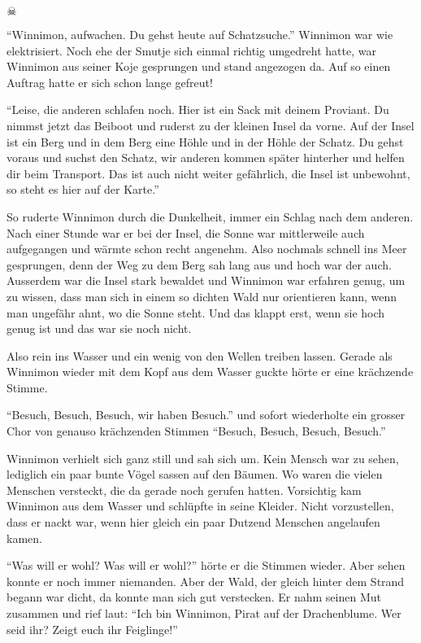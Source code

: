 \begin{center}
{\huge $\skull$}
\end{center}

\enquote{Winnimon, aufwachen. Du gehst heute auf Schatzsuche.} Winnimon war wie elektrisiert. Noch ehe der Smutje sich einmal richtig umgedreht hatte, war Winnimon aus seiner Koje gesprungen und stand angezogen da. Auf so einen Auftrag hatte er sich schon lange gefreut!

\enquote{Leise, die anderen schlafen noch. Hier ist ein Sack mit deinem Proviant. Du nimmst jetzt das Beiboot und ruderst zu der kleinen Insel da vorne. Auf der Insel ist ein Berg und in dem Berg eine Höhle und in der Höhle der Schatz. Du gehst voraus und suchst den Schatz, wir anderen kommen später hinterher und helfen dir beim Transport. Das ist auch nicht weiter gefährlich, die Insel ist unbewohnt, so steht es hier auf der Karte.}

So ruderte Winnimon durch die Dunkelheit, immer ein Schlag nach dem anderen. Nach einer Stunde war er bei der Insel, die Sonne war mittlerweile auch aufgegangen und wärmte schon recht angenehm. Also nochmals schnell ins Meer gesprungen, denn der Weg zu dem Berg sah lang aus und hoch war der auch. Ausserdem war die Insel stark bewaldet und Winnimon war erfahren genug, um zu wissen, dass man sich in einem so dichten Wald nur orientieren kann, wenn man ungefähr ahnt, wo die Sonne steht. Und das klappt erst, wenn sie hoch genug ist und das war sie noch nicht.

Also rein ins Wasser und ein wenig von den Wellen treiben lassen. Gerade als Winnimon wieder mit dem Kopf aus dem Wasser guckte hörte er eine krächzende Stimme.

\enquote{Besuch, Besuch, Besuch, wir haben Besuch.} und sofort wiederholte ein grosser Chor von genauso krächzenden Stimmen \enquote{Besuch, Besuch, Besuch, Besuch.}

Winnimon verhielt sich ganz still und sah sich um. Kein Mensch war zu sehen, lediglich ein paar bunte Vögel sassen auf den Bäumen. Wo waren die vielen Menschen versteckt, die da gerade noch gerufen hatten. Vorsichtig kam Winnimon aus dem Wasser und schlüpfte in seine Kleider. Nicht vorzustellen, dass er nackt war, wenn hier gleich ein paar Dutzend Menschen angelaufen kamen.

\enquote{Was will er wohl? Was will er wohl?} hörte er die Stimmen wieder. Aber sehen konnte er noch immer niemanden. Aber der Wald, der gleich hinter dem Strand begann war dicht, da konnte man sich gut verstecken. Er nahm seinen Mut zusammen und rief laut: \enquote{Ich bin Winnimon, Pirat auf der Drachenblume. Wer seid ihr? Zeigt euch ihr Feiglinge!}

